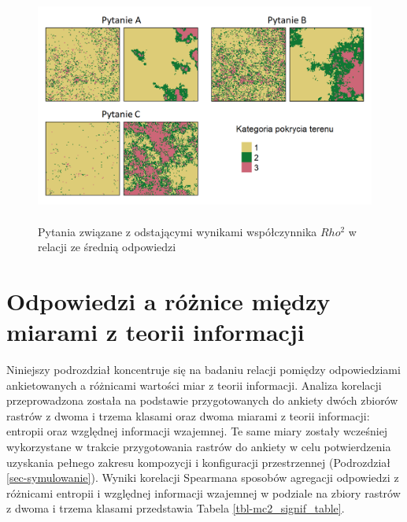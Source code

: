 \documentclass{amuthesis}
\begin{document}
\begin{figure}[t]

{\centering \includegraphics[width=5.10417in,height=3.04167in]{figures/pyt_odstajace_kopia.png}

}

\caption{\label{fig-pyt_odstajace_kopia}Pytania związane z odstającymi
wynikami współczynnika \(Rho^2\) w relacji ze średnią odpowiedzi}

\end{figure}

\hypertarget{odpowiedzi-a-ruxf3ux17cnice-miux119dzy-miarami-z-teorii-informacji}{%
\section{Odpowiedzi a różnice między miarami z teorii
informacji}\label{odpowiedzi-a-ruxf3ux17cnice-miux119dzy-miarami-z-teorii-informacji}}

Niniejszy podrozdział koncentruje się na badaniu relacji pomiędzy
odpowiedziami ankietowanych a różnicami wartości miar z teorii
informacji. Analiza korelacji przeprowadzona została na podstawie
przygotowanych do ankiety dwóch zbiorów rastrów z dwoma i trzema klasami
oraz dwoma miarami z teorii informacji: entropii oraz względnej
informacji wzajemnej. Te same miary zostały wcześniej wykorzystane w
trakcie przygotowania rastrów do ankiety w celu potwierdzenia uzyskania
pełnego zakresu kompozycji i konfiguracji przestrzennej (Podrozdział
\ref{sec-symulowanie}). Wyniki korelacji Spearmana sposobów agregacji
odpowiedzi z różnicami entropii i względnej informacji wzajemnej w
podziale na zbiory rastrów z dwoma i trzema klasami przedstawia Tabela
\ref{tbl-mc2_signif_table}.
\end{document}
